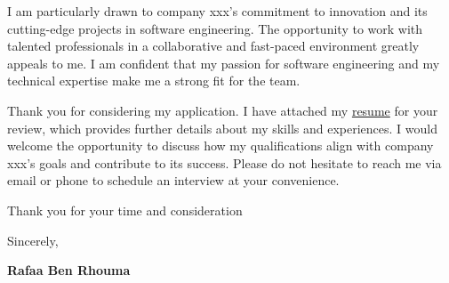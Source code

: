 \documentclass[12pt]{article}
\begin{document}
\vspace{6pt}

I am particularly drawn to company xxx's commitment to innovation and its cutting-edge projects in software engineering. The opportunity to work with talented professionals in a collaborative and fast-paced environment greatly appeals to me. I am confident that my passion for software engineering and my technical expertise make me a strong fit for the team.

\vspace{6pt}

Thank you for considering my application. I have attached my \href{https://www.java.com/fr/}{\color{blue}resume} for your review, which provides further details about my skills and experiences. I would welcome the opportunity to discuss how my qualifications align with company xxx's goals and contribute to its success. Please do not hesitate to reach me via email or phone to schedule an interview at your convenience.

\vspace{6pt}

Thank you for your time and consideration

\vspace{6pt}

Sincerely,

\bigskip

\textbf{Rafaa Ben Rhouma}
\end{document}
